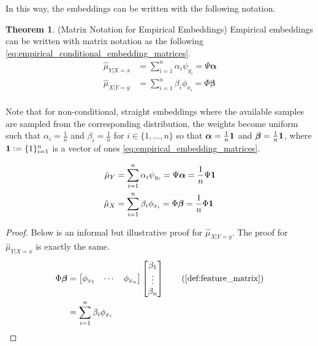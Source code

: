 \documentclass[twoside]{article} \usepackage{aistats2017}
\theoremstyle{definition}
\newtheorem{theorem}{Theorem}[section]
\newcommand{\rv}[1]{{#1}}
\newcommand{\hatmuX}{\hat{\mu}_{\rv{X}}}
\newcommand{\hatmuY}{\hat{\mu}_{\rv{Y}}}
\newcommand{\hatmuYx}{\hat{\mu}_{\rv{Y} | \rv{X} = x}}
\newcommand{\hatmuXy}{\hat{\mu}_{\rv{X} | \rv{Y} = y}}
\begin{document}
		In this way, the embeddings can be written with the following notation.
		
		\begin{theorem} \label{thm:empirical_embedding_matrices}
		(Matrix Notation for Empirical Embeddings)
		Empirical embeddings can be written with matrix notation as the following \eqref{eq:empirical_conditional_embedding_matrices}.
		\begin{equation}
		\begin{aligned}
			\hatmuYx &= \sum_{i = 1}^{n} \alpha_{i} \psi_{y_{i}} = \Psi \bm{\alpha} \\
			\hatmuXy &= \sum_{i = 1}^{n} \beta_{i} \phi_{x_{i}} = \Phi \bm{\beta} \\
		\label{eq:empirical_conditional_embedding_matrices}
		\end{aligned}
		\end{equation}
		
		Note that for non-conditional, straight embeddings where the available samples are sampled from the corresponding distribution, the weights become uniform such that $\alpha_{i} = \frac{1}{n}$ and $\beta_{i} = \frac{1}{n}$ for $i \in \{1, \dots, n\}$ so that $\bm{\alpha} = \frac{1}{n} \mathbf{1}$ and $\bm{\beta} = \frac{1}{n} \mathbf{1}$, where $\mathbf{1} := \{1\}_{i = 1}^{n}$ is a vector of ones \eqref{eq:empirical_embedding_matrices}.
		
		\begin{equation}
		\begin{aligned}
			\hatmuY &= \sum_{i = 1}^{n} \alpha_{i} \psi_{y_{i}} = \Psi \bm{\alpha} = \frac{1}{n} \Psi \bvec{1} \\
			\hatmuX &= \sum_{i = 1}^{n} \beta_{i} \phi_{x_{i}} = \Phi \bm{\beta} = \frac{1}{n} \Phi \bvec{1}
		\label{eq:empirical_embedding_matrices}
		\end{aligned}
		\end{equation}
		
		\begin{proof}
			Below is an informal but illustrative proof for $\hatmuXy$. The proof for $\hatmuYx$ is exactly the same.
			\begin{align*}
				\Phi \bm{\beta} &= \begin{bmatrix} \phi_{x_{1}} & \cdots & \phi_{x_{n}} \end{bmatrix} \begin{bmatrix} \beta_{1} \\ \vdots \\ \beta_{n} \end{bmatrix} \tag{\cref{def:feature_matrix}} \\
				&= \sum_{i = 1}^{n} \beta_{i} \phi_{x_{i}}
			\end{align*}
		\end{proof}
		\end{theorem}
		
\end{document}
